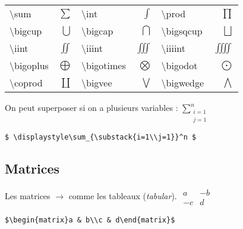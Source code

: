         \begin{center}
            \begin{tabular}{l r | l r | l r }
                \textbackslash sum & $\sum$ & \textbackslash int & $\int$ & \textbackslash prod & $\prod$ \\
                \textbackslash bigcup & $\bigcup$ & \textbackslash bigcap & $\bigcap$ & \textbackslash bigsqcup & $\bigsqcup$ \\
                \textbackslash iint & $\iint$ & \textbackslash iiint & $\iiint$ & \textbackslash iiiint & $\iiiint$ \\
                \textbackslash bigoplus & $\bigoplus$ & \textbackslash bigotimes & $\bigotimes$ & \textbackslash bigodot & $\bigodot$ \\
                \textbackslash coprod & $\coprod$ & \textbackslash bigvee & $\bigvee$ & \textbackslash bigwedge & $\bigwedge$ \\
            \end{tabular}
        \end{center}

        On peut superposer si on a plusieurs variables : $\displaystyle\sum_{\substack{i = 1\\j = 1}}^n$
        \begin{lstlisting}
$ \displaystyle\sum_{\substack{i=1\\j=1}}^n $
        \end{lstlisting}



    \subsection{Matrices}
        Les matrices $\rightarrow$ comme les tableaux (\textit{tabular}). $\begin{matrix}a & -b\\-c &d\end{matrix}$
        \begin{lstlisting}
$\begin{matrix}a & b\\c & d\end{matrix}$
        \end{lstlisting}

